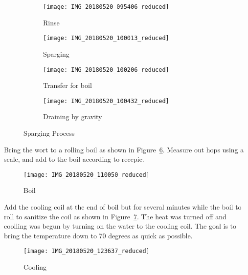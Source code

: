 \begin{figure}[H]
\centering
\begin{subfigure}[b]{.245\textwidth}
  \texttt{[image: IMG\_20180520\_095406\_reduced]}
  \caption{Rinse}\label{fig:rinse}
\end{subfigure}
\begin{subfigure}[b]{.245\textwidth}
  \centering
  \texttt{[image: IMG\_20180520\_100013\_reduced]}
  \caption{Sparging}\label{fig:sparging}
\end{subfigure}
\begin{subfigure}[b]{.245\textwidth}
  \centering
  \texttt{[image: IMG\_20180520\_100206\_reduced]}
  \caption{Transfer for boil}\label{fig:transfer}
\end{subfigure}
\begin{subfigure}[b]{.245\textwidth}
  \centering
  \texttt{[image: IMG\_20180520\_100432\_reduced]}
  \caption{Draining by gravity}\label{fig:gravitydrain}
\end{subfigure}
\caption{Sparging Process}\label{subfig:spargingprocess}
\end{figure}

\FloatBarrier{}
\FloatBarrier{}

Bring the wort to a rolling boil as shown in Figure~\ref{fig:boil}.  Measure out hops using a scale, and add to the boil according to recepie.

\begin{figure}[H]
  \centering
  \texttt{[image: IMG\_20180520\_110050\_reduced]}
  \caption{Boil}\label{fig:boil}
\end{figure}

\FloatBarrier{}
\clearpage
\FloatBarrier{}

Add the cooling coil at the end of boil but for several minutes while the boil to roll to sanitize the coil as shown in Figure~\ref{fig:cooling}.  The heat was turned off and coolling was begun by turning on the water to the cooling coil. The goal is to bring the temperature down to 70 degrees as quick as possible.

\begin{figure}[H]
  \centering
  \texttt{[image: IMG\_20180520\_123637\_reduced]}
  \caption{Cooling}\label{fig:cooling}
\end{figure}

